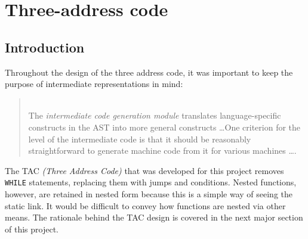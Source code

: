 \chapter{Three-address code}
\section{Introduction}
\label{sec:tacintro}
Throughout the design of the three address code, it was important to keep the purpose of intermediate representations in mind:

\begin{quotation}
	\ \\The \emph{intermediate code generation module} translates language-specific constructs in the AST into more general constructs \ldots One criterion for the level of the intermediate code is that it should be reasonably straightforward to generate machine code from it for various machines \ldots \cite{grune2000}.
\end{quotation}

The TAC \emph{(Three Address Code)} that was developed for this project removes \verb!WHILE! statements, replacing them with jumps and conditions. Nested functions, however, are retained in nested form because this is a simple way of seeing the static link. It would be difficult to convey how functions are nested via other means. The rationale behind the TAC design is covered in the next major section of this project.